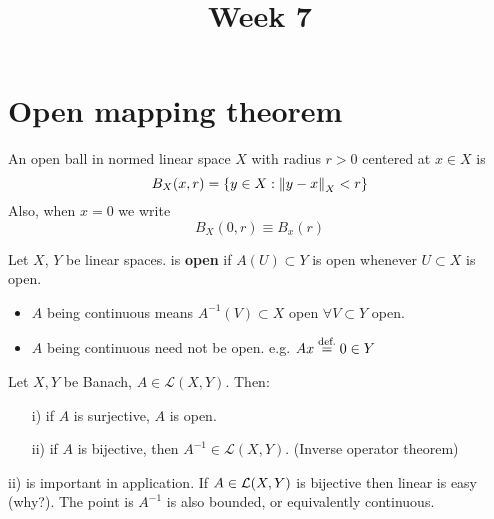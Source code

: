 \documentclass{article}
\title{Week 7}
\begin{document}
\maketitle
\section{Open mapping theorem}
\begin{definition}\nl
An open ball in normed linear space $X$ with radius $r>0$ centered at $x\in X$ is
$$
B_X(x,r)=\{y\in X:\left\|{y-x}\right\|_X<r\}
$$
Also, when $x=0$ we write 
$$
B_X(0,r)\equiv B_x(r)
$$
\end{definition}

\begin{definition}\nl
	Let $X$, $Y$ be linear spaces.  is \textbf{open} if $A(U)\subset Y $ is open whenever $U\subset X$ is open.
\end{definition}
\begin{remark}
\phantom{something}
\begin{itemize}
    \item $A$ being continuous means $A^{-1}(V)\subset{X}$ open $\forall V\subset Y$ open.
    \item $A$ being continuous need not be open. e.g. $Ax \stackrel{\text{def.}}{=} 0\in Y$
\end{itemize}
\end{remark}

\begin{theorem}\nl
\label{open mapping theorem}
	Let $X,Y$ be Banach, $A\in \mathcal{L}(X,Y)$. Then:
	\begin{itemize}
	    \item[i)] if $A$ is surjective, $A$ is open.
	    \item[ii)] if $A$ is bijective, then $A^{-1}\in \mathcal{L}(X,Y)$. (Inverse operator theorem)
	\end{itemize}
\end{theorem}

\begin{remark}\nl
ii) is important in application. If $A\in\mathcal{L}({X},{Y})$ is bijective then  linear is easy (why?). The point is $A^{-1}$ is also bounded, or equivalently continuous.
\end{remark}
\end{document}
